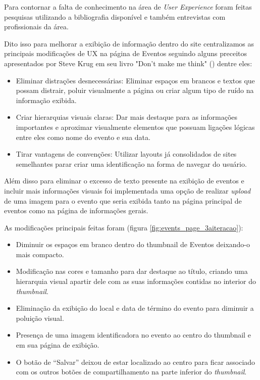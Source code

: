 \par Para contornar a falta de conhecimento na área de \emph{User Experience} foram feitas pesquisas utilizando a bibliografia disponível e também entrevistas com profissionais da área.
	\par Dito isso para  melhorar a exibição de informação dentro do site centralizamos as principais modificações de UX na página de Eventos seguindo alguns preceitos apresentados por Steve Krug  em seu livro "Don't make me think" (\cite{krug:00}) dentre eles:
	\begin{itemize}
	\item Eliminar distrações desnecessárias: Eliminar espaços em brancos e textos que possam distrair, poluir visualmente a página ou criar algum tipo de ruído na informação exibida.
	\item Criar hierarquias visuais claras: Dar mais destaque para as informações importantes e aproximar visualmente elementos que possuam ligações lógicas entre eles como nome do evento e sua data.
	\item Tirar vantagens de convenções: Utilizar layouts já consolidados  de sites semelhantes parar criar uma identificação na forma de navegar do usuário.
\end{itemize}
	\par Além disso para eliminar o excesso de texto presente na exibição de eventos e incluir mais informações visuais foi implementada uma opção de realizar \emph{upload} de uma imagem para o evento que seria exibida tanto na página principal de eventos como na página de informações gerais.	
\par As modificações principais feitas foram (figura \ref{fig:events_page_3aiteracao}):
\begin{itemize}
\item Diminuir os espaços em branco dentro do thumbnail de Eventos deixando-o mais compacto.
\item Modificação nas cores e tamanho para dar destaque ao título, criando uma hierarquia visual apartir dele com as suas informações contidas no interior do \emph{thumbnail}.
\item Eliminação da exibição do local e data de término do evento para diminuir a poluição visual.
\item Presença de uma imagem identificadora no evento ao centro do thumbnail e em sua página de exibição.
\item O botão de “Salvar” deixou de estar localizado ao centro para ficar associado com os outros botões de compartilhamento na parte inferior do \emph{thumbnail}.
\end{itemize}

